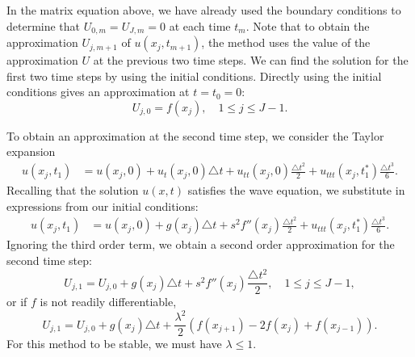 In the matrix equation above, we have already used the boundary conditions to determine that 
$U_{0,m} = U_{J,m} = 0$ at each time $t_m$. 
Note that to obtain the approximation $U_{j,m+1}$ of $u(x_j,t_{m+1})$, the method uses the value of the approximation $U$ at the previous two time steps. We can find the solution for the first two time steps by using the initial conditions. Directly using the initial conditions gives an approximation at $t = t_0 = 0:$
\[
U_{j,0} = f(x_j), \quad 1 \leq j \leq J-1.
\]

To obtain an approximation at the second time step, we consider the Taylor expansion 
\begin{align*}
	u(x_j,t_1) &= u(x_j, 0) + u_t(x_j,0) \triangle t + u_{tt}(x_j,0) \frac{\triangle t^2}{2} + u_{ttt}(x_j,t_1^*) \frac{\triangle t^3}{6}.
\end{align*}
Recalling that the solution $u(x,t)$ satisfies the wave equation, we substitute in expressions from our initial conditions: 
\begin{align*}
	u(x_j,t_1) &= u(x_j, 0) +  g(x_j) \triangle t+ s^2 f''(x_j)\frac{\triangle t^2}{2} +  u_{ttt}(x_j,t_1^*) \frac{\triangle t^3}{6}.
\end{align*}
Ignoring the third order term, we obtain a second order approximation for the second time step: 
\[
U_{j,1}= U_{j,0} + g(x_j) \triangle t+ s^2 f''(x_j) \frac{\triangle t^2}{2}, \quad 1 \leq j \leq J-1,
\]
or if $f$ is not readily differentiable,
\[
U_{j,1}= U_{j,0} + g(x_j) \triangle t+ \frac{\lambda^2}{2} (f(x_{j+1}) -2 f(x_{j}) + f(x_{j-1})).
\]
For this method to be stable, we must have $\lambda \leq 1$.



